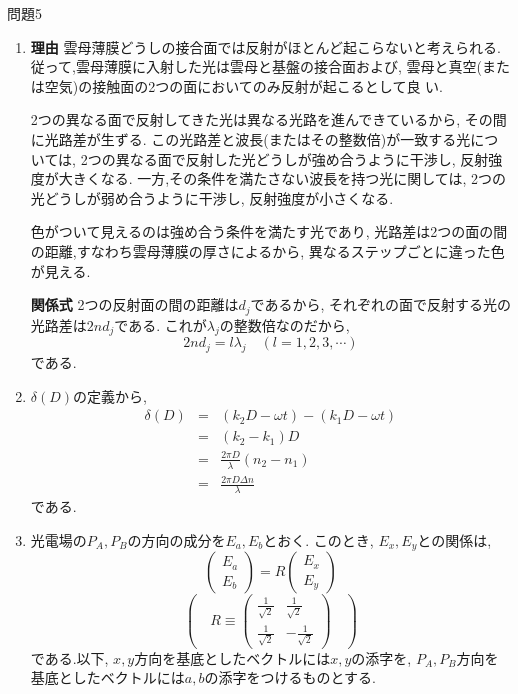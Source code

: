 \documentclass[fleqn]{jbook}
\begin{document}
\begin{answer}{問題5}{}
\begin{enumerate}
\item \textbf{理由}\quad
雲母薄膜どうしの接合面では反射がほとんど起こらないと考えられる.
従って,雲母薄膜に入射した光は雲母と基盤の接合面および,
雲母と真空(または空気)の接触面の2つの面においてのみ反射が起こるとして良
い. 


2つの異なる面で反射してきた光は異なる光路を進んできているから,
その間に光路差が生ずる.
この光路差と波長(またはその整数倍)が一致する光については,
 2つの異なる面で反射した光どうしが強め合うように干渉し,
反射強度が大きくなる.
一方,その条件を満たさない波長を持つ光に関しては,
 2つの光どうしが弱め合うように干渉し,
反射強度が小さくなる.


色がついて見えるのは強め合う条件を満たす光であり,
光路差は2つの面の間の距離,すなわち雲母薄膜の厚さによるから,
異なるステップごとに違った色が見える.


\textbf{関係式}\quad
2つの反射面の間の距離は$d_j$であるから,
それぞれの面で反射する光の光路差は$2 n d_j$である.
これが$\lambda_j$の整数倍なのだから,
\begin{equation}
 2 n d_j = l \lambda_j \quad (l = 1, 2, 3, \cdots)
\end{equation}
である.

\item
$\delta (D)$の定義から,
\begin{eqnarray}
 \delta (D) & = & (k_2 D - \omega t) - (k_1 D - \omega t)
  \nonumber
  \\
 & = & (k_2 - k_1) D
  \nonumber
  \\
 & = &  \frac{2 \pi D}{\lambda} (n_2 - n_1)
  \nonumber
  \\
 & = &  \frac{2 \pi D \Delta \! n}{\lambda}
\end{eqnarray}
である.

\item
光電場の$P_A, P_B$の方向の成分を$E_a, E_b$とおく.
このとき, $E_x, E_y$との関係は,
\[
 \left(
  \begin{array}{c}
   E_a \\ E_b
  \end{array}
 \right)
 =
 R
 \left(
  \begin{array}{c}
   E_x \\ E_y
  \end{array}
 \right)
\]
\[
 \left( \quad
 R \equiv
 \left(
  \begin{array}{cc}
   \frac{1}{\sqrt{2}} & \frac{1}{\sqrt{2}} \\
   \frac{1}{\sqrt{2}} & -\frac{1}{\sqrt{2}}
  \end{array}
 \right) \quad
 \right)
\]
である.以下, $x, y$方向を基底としたベクトルには$x, y$の添字を,
 $P_A, P_B$方向を基底としたベクトルには$a, b$の添字をつけるものとする.



\end{enumerate}
\end{answer}
\end{document}
